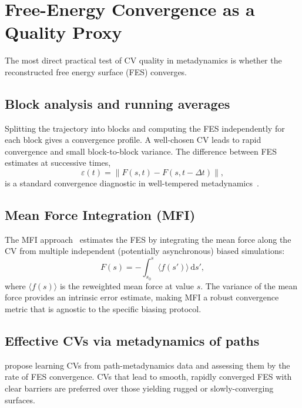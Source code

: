 \documentclass[12pt, a4paper]{article}
\begin{document}
\section{Free-Energy Convergence as a Quality Proxy}
\label{sec:freeenergy}

The most direct practical test of CV quality in metadynamics is whether 
the reconstructed free energy surface (FES) converges.

\subsection{Block analysis and running averages}

Splitting the trajectory into blocks and computing the FES 
independently for each block gives a convergence profile.  A 
well-chosen CV leads to rapid convergence and small block-to-block 
variance.  The difference between FES estimates at successive times,
\begin{equation}
  \varepsilon(t) = \left\|F(s,t) - F(s,t-\Delta t)\right\|,
\end{equation}
is a standard convergence diagnostic in well-tempered 
metadynamics~\citep{Barducci2008}.

\subsection{Mean Force Integration (MFI)}

The MFI approach~\citep{Bjola2024MFI} estimates the FES by 
integrating the mean force along the CV from multiple independent 
(potentially asynchronous) biased simulations:
\begin{equation}
  F(s) = -\int_{s_0}^{s} \langle f(s') \rangle\,\mathrm{d}s',
\end{equation}
where $\langle f(s)\rangle$ is the reweighted mean force at value $s$.  
The variance of the mean force provides an intrinsic error estimate, 
making MFI a robust convergence metric that is agnostic to the specific 
biasing protocol.

\subsection{Effective CVs via metadynamics of paths}

\citet{Muller2024EffCVs} propose learning CVs from path-metadynamics 
data and assessing them by the rate of FES convergence.  CVs that lead 
to smooth, rapidly converged FES with clear barriers are preferred over 
those yielding rugged or slowly-converging surfaces.
\end{document}
